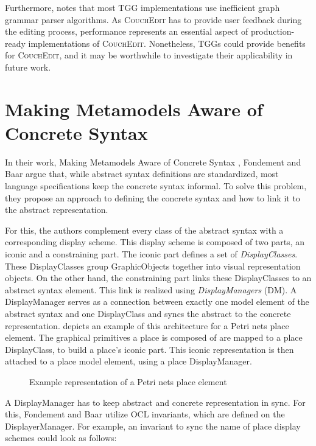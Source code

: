 Furthermore, \cite{schurr_15_2008} notes that most TGG implementations use inefficient graph grammar parser algorithms. As \textsc{CouchEdit} has to provide user feedback during the editing process, performance represents an essential aspect of production-ready implementations of \textsc{CouchEdit}. Nonetheless, TGGs could provide benefits for \textsc{CouchEdit}, and it may be worthwhile to investigate their applicability in future work. 



\section{Making Metamodels Aware of Concrete Syntax}
\label{sec:fondement}
In their work, Making Metamodels Aware of Concrete Syntax \cite{fondement_making_2005}, Fondement and Baar argue that, while abstract syntax definitions are standardized, most language specifications keep the concrete syntax informal. To solve this problem, they propose an approach to defining the concrete syntax and how to link it to the abstract representation.

For this, the authors complement every class of the abstract syntax with a corresponding display scheme. This display scheme is composed of two parts, an iconic and a constraining part. The iconic part defines a set of \emph{DisplayClasses}. These DisplayClasses group GraphicObjects together into visual representation objects. On the other hand, the constraining part links these DisplayClasses to an abstract syntax element. This link is realized using \emph{DisplayManagers} (DM). A DisplayManager serves as a connection between exactly one model element of the abstract syntax and one DisplayClass and syncs the abstract to the concrete representation.  depicts an example of this architecture for a Petri nets place element. The graphical primitives a place is composed of are mapped to a place DisplayClass, to build a place's iconic part. This iconic representation is then attached to a place model element, using a place DisplayManager.


\begin{figure}[H]
  \centering
  
  \caption{Example representation of a Petri nets place element}
  \label{fig:fondement_dm}
\end{figure}

A DisplayManager has to keep abstract and concrete representation in sync. For this, Fondement and Baar utilize OCL invariants, which are defined on the DisplayerManager. For example, an invariant to sync the name of place display schemes could look as follows:

